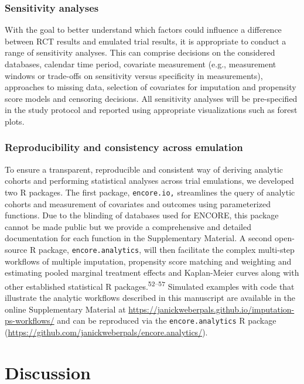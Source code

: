 \documentclass[
  letterpaper,
  DIV=11,
  numbers=noendperiod]{scrartcl}
\begin{document}
\subsubsection{Sensitivity analyses}\label{sensitivity-analyses}

With the goal to better understand which factors could influence a
difference between RCT results and emulated trial results, it is
appropriate to conduct a range of sensitivity analyses. This can
comprise decisions on the considered databases, calendar time period,
covariate measurement (e.g., measurement windows or trade-offs on
sensitivity versus specificity in measurements), approaches to missing
data, selection of covariates for imputation and propensity score models
and censoring decisions. All sensitivity analyses will be pre-specified
in the study protocol and reported using appropriate visualizations such
as forest plots.

\subsubsection{Reproducibility and consistency across
emulation}\label{reproducibility-and-consistency-across-emulation}

To ensure a transparent, reproducible and consistent way of deriving
analytic cohorts and performing statistical analyses across trial
emulations, we developed two R packages. The first package,
\texttt{encore.io,} streamlines the query of analytic cohorts and
measurement of covariates and outcomes using parameterized functions.
Due to the blinding of databases used for ENCORE, this package cannot be
made public but we provide a comprehensive and detailed documentation
for each function in the Supplementary Material. A second open-source R
package, \texttt{encore.analytics}, will then facilitate the complex
multi-step workflows of multiple imputation, propensity score matching
and weighting and estimating pooled marginal treatment effects and
Kaplan-Meier curves along with other established statistical R
packages.\textsuperscript{52--57} Simulated examples with code that
illustrate the analytic workflows described in this manuscript are
available in the online Supplementary Material at
\url{https://janickweberpals.github.io/imputation-ps-workflows/} and can
be reproduced via the \texttt{encore.analytics} R package
(\url{https://github.com/janickweberpals/encore.analytics/}).

\newpage{}

\section{Discussion}\label{discussion}
\end{document}
